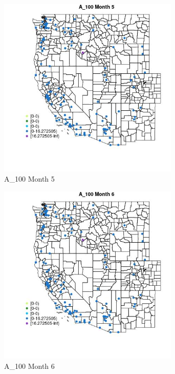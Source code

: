 \begin{figure} 
\centering  
\includegraphics[width=0.77\textwidth]{Code_Outputs/Report_ML_input_PM25_Step4_part_e_de_duplicated_aves_MapObsMo5A_100.jpg} 
\caption{\label{fig:Report_ML_input_PM25_Step4_part_e_de_duplicated_avesMapObsMo5A_100}A_100 Month 5} 
\end{figure} 
 

\begin{figure} 
\centering  
\includegraphics[width=0.77\textwidth]{Code_Outputs/Report_ML_input_PM25_Step4_part_e_de_duplicated_aves_MapObsMo6A_100.jpg} 
\caption{\label{fig:Report_ML_input_PM25_Step4_part_e_de_duplicated_avesMapObsMo6A_100}A_100 Month 6} 
\end{figure} 
 

